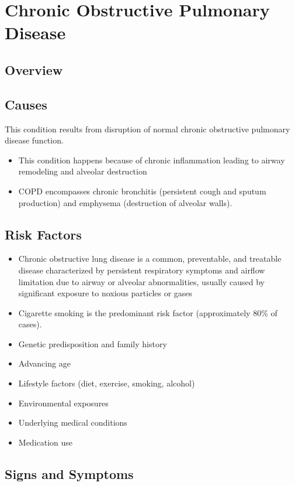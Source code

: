 \chapter{Chronic Obstructive Pulmonary Disease}
\label{sec:Chronic Obstructive Pulmonary Disease}

\section{Overview}

\section{Causes}
This condition results from disruption of normal chronic obstructive pulmonary disease function.

\begin{itemize}[noitemsep]
  \item This condition happens because of chronic inflammation leading to airway remodeling and alveolar destruction
  \item COPD encompasses chronic bronchitis (persistent cough and sputum production) and emphysema (destruction of alveolar walls).
\end{itemize}
\section{Risk Factors}
\begin{itemize}[noitemsep]
  \item Chronic obstructive lung disease is a common, preventable, and treatable disease characterized by persistent respiratory symptoms and airflow limitation due to airway or alveolar abnormalities, usually caused by significant exposure to noxious particles or gases
  \item Cigarette smoking is the predominant risk factor (approximately 80\% of cases).
  \item Genetic predisposition and family history
  \item Advancing age
  \item Lifestyle factors (diet, exercise, smoking, alcohol)
  \item Environmental exposures
  \item Underlying medical conditions
  \item Medication use
\end{itemize}
\section{Signs and Symptoms}

